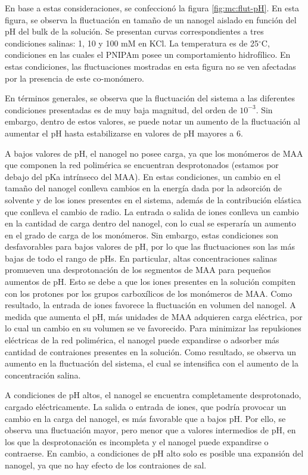 	En base a estas consideraciones, se confeccion\'o la figura \ref{fig:mc:flut-pH}. En esta figura, se observa la fluctuaci\'on en tama\~no de un nanogel aislado en funci\'on del pH del bulk de la soluci\'on. Se presentan curvas correspondientes a tres condiciones salinas: 1, 10 y 100 mM en KCl. La temperatura es de 25$^\circ$C, condiciones en las cuales el PNIPAm posee un comportamiento hidrof\'ilico. En estas condiciones, las fluctuaciones mostradas en esta figura no se ven afectadas por la presencia de este co-mon\'omero.
	
	En t\'erminos generales, se observa que la fluctuaci\'on del sistema a las diferentes condiciones presentadas es de muy baja magnitud, del orden de $10^{-3}$. Sin embargo, dentro de estos valores, se puede notar un aumento de la fluctuaci\'on al aumentar el pH hasta estabilizarse en valores de pH mayores a 6.
	
	A bajos valores de pH, el nanogel no posee carga, ya que los mon\'omeros de MAA que componen la red polim\'erica se encuentran desprotonados (estamos por debajo del pKa intr\'inseco del MAA). En estas condiciones, un cambio en el tama\~no del nanogel conlleva cambios en la energ\'ia dada por la adsorci\'on de solvente y de los iones presentes en el sistema, adem\'as de la contribuci\'on el\'astica que conlleva el cambio de radio.
	La entrada o salida de iones conlleva un cambio en la cantidad de carga dentro del nanogel, con lo cual se esperar\'ia un aumento en el grado de carga de los mon\'omeros. Sin embargo, estas condiciones son desfavorables para bajos valores de pH, por lo que las fluctuaciones son las m\'as bajas de todo el rango de pHs.
	En particular, altas concentraciones salinas promueven una desprotonaci\'on de los segmentos de MAA para peque\~nos aumentos de pH. Esto se debe a que los iones presentes en la soluci\'on compiten con los protones por los grupos carbox\'ilicos de los mon\'omeros de MAA. Como resultado, la entrada de iones favorece la fluctuaci\'on en volumen del nanogel.
	A medida que aumenta el pH, m\'as unidades de MAA adquieren carga el\'ectrica, por lo cual un cambio en su volumen se ve favorecido. Para minimizar las repulsiones el\'ectricas de la red polim\'erica, el nanogel puede expandirse o adsorber m\'as cantidad de contraiones presentes en la soluci\'on. Como resultado, se observa un aumento en la fluctuaci\'on del sistema, el cual se intensifica con el aumento de la concentraci\'on salina.
	
	A condiciones de pH altos, el nanogel se encuentra completamente desprotonado, cargado el\'ectricamente. La salida o entrada de iones, que podr\'ia provocar un cambio en la carga del nanogel, es m\'as favorable que a bajos pH. Por ello, se observa una fluctuaci\'on mayor, pero menor que a valores intermedios de pH, en los que la desprotonaci\'on es incompleta y el nanogel puede expandirse o contraerse. En cambio, a condiciones de pH alto solo es posible una expansi\'on del nanogel, ya que no hay efecto de los contraiones de sal.
	
